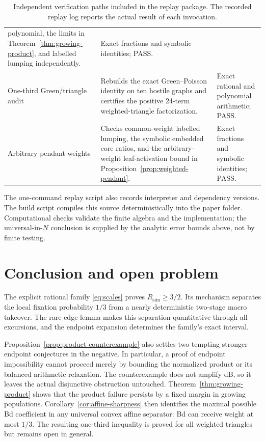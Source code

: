 \documentclass[11pt]{article}
\theoremstyle{definition}
\theoremstyle{remark}
\begin{document}
\begin{table}[H]
\begin{tabularx}{\textwidth}{>{\raggedright\arraybackslash}p{}
                              >{\raggedright\arraybackslash}p{}
                              >{\raggedright\arraybackslash}X}
polynomial, the limits in Theorem~\ref{thm:growing-product}, and labelled
lumping independently.
& Exact fractions and symbolic identities; PASS.\\
One-third Green/triangle audit
& Rebuilds the exact Green--Poisson identity on ten hostile graphs and
certifies the positive 24-term weighted-triangle factorization.
& Exact rational and polynomial arithmetic; PASS.\\
Arbitrary pendant weights
& Checks common-weight labelled lumping, the symbolic embedded core ratios,
and the arbitrary-weight leaf-activation bound in
Proposition~\ref{prop:weighted-pendant}.
& Exact fractions and symbolic identities; PASS.\\
\bottomrule
\end{tabularx}
\caption{Independent verification paths included in the replay package.
The recorded replay log reports the actual result of each invocation.}
\label{tab:verifiers}
\end{table}

The one-command replay script also records interpreter and dependency
versions.  The build script compiles this source deterministically into the
paper folder.  Computational checks validate the finite algebra and the
implementation; the universal-in-$N$ conclusion is supplied by the analytic
error bounds above, not by finite testing.

\section{Conclusion and open problem}

The explicit rational family \eqref{eq:scales} proves
$R_{\mathrm{sim}}\geq3/2$.  Its mechanism separates the local fixation
probability $1/3$ from a nearly deterministic two-stage macro takeover.  The
rare-edge lemma makes this separation quantitative through all excursions,
and the endpoint expansion determines the family's exact interval.

Proposition~\ref{prop:product-counterexample} also settles two tempting
stronger endpoint conjectures in the negative.  In particular, a proof of
endpoint impossibility cannot proceed merely by bounding the normalized
product or its balanced arithmetic relaxation.  The counterexample does not
amplify dB, so it leaves the actual disjunctive obstruction untouched.
Theorem~\ref{thm:growing-product} shows that the product failure persists by
a fixed margin in growing populations.  Corollary~\ref{cor:affine-sharpness}
then identifies the maximal possible Bd coefficient in any universal convex
affine separator: Bd can receive weight at most $1/3$.  The resulting
one-third inequality is
proved for all weighted triangles but remains open in general.
\end{document}
